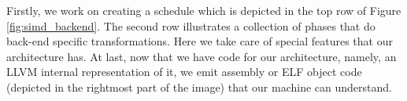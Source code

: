 

Firstly, we work on creating a schedule which is depicted in the top row of Figure \ref{fig:simd_backend}. The second row illustrates a collection of phases that do back-end specific transformations. Here we take care of special features that our architecture has. At last, now that we have code for our architecture, namely, an LLVM internal representation of it, we emit assembly or ELF object code (depicted in the rightmost part of the image) that our machine can understand.

